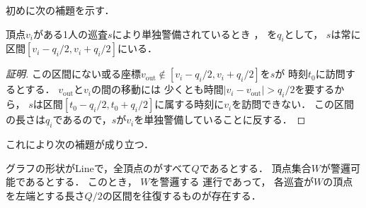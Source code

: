 初めに次の補題を示す．

\begin{lemm}
	\label{lemm:movableAreaofPatrolleronLine}
	頂点$v_i$がある1人の巡査$s$により単独警備されているとき
	，
	{\idletime}を$q_i$として，
		$s$は常に区間$[v_i - q_i/2, v_i + q_i/2]$にいる．
\end{lemm}

\begin{proof}[証明]
	\newcommand{\vout}{v_{\mathrm{out}}}
	この区間にない或る座標$\vout \notin [v_i - q_i/2, v_i + q_i/2]$を$s$が
	時刻$t_0$に訪問するとする．
	$\vout$と$v_i$の間の移動には
	少くとも時間$\lvert v_i - \vout \rvert > q _i / 2$を要するから，
	$s$は区間$[t_0 - q _i / 2, t_0 + q _i / 2]$に属する時刻に$v_i$を訪問できない．
	この区間の長さは$
		q_i
	$であるので，$s$が$v _i$を単独警備していることに反する．
\end{proof}



これにより次の補題が成り立つ．


\begin{lemm}
	\label{lemm:LineEqualTimelimitIndependentInterval}
	グラフの形状がLineで，全頂点の{\idletime}がすべて$Q$であるとする．
	頂点集合$W$が警邏可能であるとする．
	このとき，
	$W$を警邏する
	運行であって，
        各巡査が$W$の頂点を左端とする長さ$Q / 2$の区間を往復するものが存在する．
\end{lemm}


